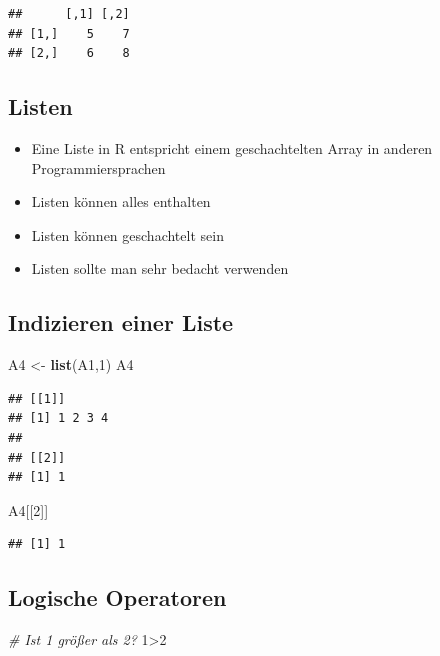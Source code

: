\documentclass[]{article}
\newenvironment{Shaded}{\begin{snugshade}}{\end{snugshade}}
\newcommand{\KeywordTok}[1]{\textcolor[rgb]{0.13,0.29,0.53}{\textbf{{#1}}}}
\newcommand{\DecValTok}[1]{\textcolor[rgb]{0.00,0.00,0.81}{{#1}}}
\newcommand{\StringTok}[1]{\textcolor[rgb]{0.31,0.60,0.02}{{#1}}}
\newcommand{\CommentTok}[1]{\textcolor[rgb]{0.56,0.35,0.01}{\textit{{#1}}}}
\newcommand{\NormalTok}[1]{{#1}}
\providecommand{\tightlist}{%
  \setlength{\itemsep}{0pt}\setlength{\parskip}{0pt}}
\begin{document}
\begin{verbatim}
##      [,1] [,2]
## [1,]    5    7
## [2,]    6    8
\end{verbatim}

\subsection{Listen}\label{listen}

\begin{itemize}
\tightlist
\item
  Eine Liste in R entspricht einem geschachtelten Array in anderen
  Programmiersprachen
\item
  Listen können alles enthalten
\item
  Listen können geschachtelt sein
\item
  Listen sollte man sehr bedacht verwenden
\end{itemize}

\subsection{Indizieren einer Liste}\label{indizieren-einer-liste}

\begin{Shaded}
\begin{Highlighting}[]
\NormalTok{A4 <-}\StringTok{ }\KeywordTok{list}\NormalTok{(A1,}\DecValTok{1}\NormalTok{)}
\NormalTok{A4}
\end{Highlighting}
\end{Shaded}

\begin{verbatim}
## [[1]]
## [1] 1 2 3 4
## 
## [[2]]
## [1] 1
\end{verbatim}

\begin{Shaded}
\begin{Highlighting}[]
\NormalTok{A4[[}\DecValTok{2}\NormalTok{]]}
\end{Highlighting}
\end{Shaded}

\begin{verbatim}
## [1] 1
\end{verbatim}

\subsection{Logische Operatoren}\label{logische-operatoren}

\begin{Shaded}
\begin{Highlighting}[]
\CommentTok{# Ist 1 größer als 2?}
\DecValTok{1}\NormalTok{>}\DecValTok{2}
\end{Highlighting}
\end{Shaded}
\end{document}
